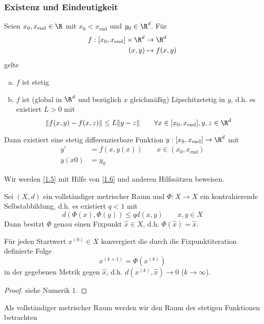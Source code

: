 \documentclass[
]{mycourse}
\begin{document}
\subsubsection{Existenz und Eindeutigkeit}


\begin{st} \label{1.5}
	Seien $x_0, x_{\text{end}} \in \R$ mit $x_0 < x_{\text{end}}$ und $y_0 \in \R^d$.
	Für
	\begin{align*}
		f: [x_0, x_{\text{end}}] \times \R^d &\to \R^d \\
		(x,y) & \mapsto f(x,y)
	\end{align*}
	gelte
	\begin{enumerate}[a)]
		\item
			$f$ ist stetig
		\item
			$f$ ist (global in $\R^d$ und bezüglich $x$ gleichmäßig) Lipschitzstetig in $y$, d.h. es existiert $L > 0$ mit
			\[
				\|f(x,y) - f(x,z)\| \le L \|y-z\|
				\qquad \forall x\in [x_0,x_{\text{end}}], y,z \in \R^d
			\]
	\end{enumerate}
	Dann existiert eine stetig differenzierbare Funktion $y : [x_0,x_{\text{end}}] \to \R^d$ mit
	\begin{align*}
		y' &= f(x,y(x)) \qquad x\in(x_0,x_{\text{end}}) \\
		y(x0) &= y_0
	\end{align*}
\end{st}

Wir werden \ref{1.5} mit Hilfe von \ref{1.6} und anderen Hilfssätzen beweisen.

\begin{st} \label{1.6}
	Sei $(X,d)$ ein vollständiger metrischer Raum und $\Phi: X \to X$ ein kontrahierende Selbstabbildung, d.h. es existiert $q < 1$ mit
	\[
		d(\Phi(x), \Phi(y)) \le q d(x,y)
		\qquad x,y \in X
	\]
	Dann besitzt $\Phi$ genau einen Fixpunkt $\hat x \in X$, d.h. $\Phi(\hat x) = \hat x$.

	Für jeden Startwert $x^{(0)} \in X$ konvergiert die durch die Fixpunktiteration definierte Folge
	\[
		x^{(k+1)} = \Phi(x^{(k)})
	\]
	in der gegebenen Metrik gegen $\hat x$, d.h. $d(x^{(k)},\hat x) \to 0$ ($k \to \infty$).
	\begin{proof}
		siehe Numerik 1.
	\end{proof}
\end{st}


Als vollständiger metrischer Raum werden wir den Raum der stetigen Funktionen betrachten
\end{document}
